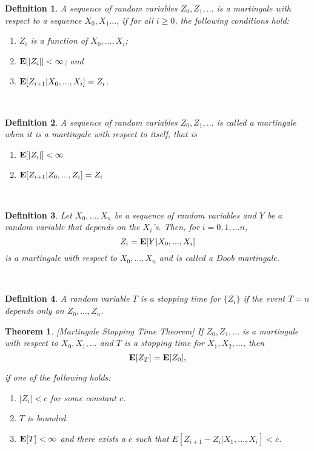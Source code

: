 \documentclass[11pt]{article}
\theoremstyle{mytheoremstyle}
\newtheorem{theorem}{Theorem}
\newtheorem{definition}{Definition}
\begin{document}
\begin{definition}
	A sequence of random variables $Z_{0},Z_{1},...$ is a \emph{martingale
		with respect to a sequence $X_{0},X_{1}...$,} if for all $i\geq0$,
	the following conditions hold:
	
	\begin{enumerate}
		\item $Z_{i}$ is a function of $X_{0},...,X_{i}$;
		\item $\mathrm{\mathbf{E}}[|Z_{i}|]<\infty$; and
		\item $\mathrm{\mathbf{E}}[Z_{i+1}|X_{0},...,X_{i}]=Z_{i}$.
	\end{enumerate}
\end{definition}
~
\begin{definition}
	A sequence of random variables $Z_{0},Z_{1},...$ is called a \emph{martingale}
	when it is a martingale with respect to itself, that is
	
	\begin{enumerate}
		\item $\mathrm{\mathbf{E}}[|Z_{i}|]<\infty$ 
		\item $\mathrm{\mathbf{E}}[Z_{i+1}|Z_{0},...,Z_{i}]=Z_{i}$
	\end{enumerate}
\end{definition}
~
\begin{definition}
	Let $X_{0},...,X_{n}$ be a sequence of random variables and $Y$
	be a random variable that depends on the $X_{i}$'s. Then, for $i=0,1,...n$,
	\[
	Z_{i}=\mathrm{\mathbf{E}}[Y|X_{0},...,X_{i}]
	\]
	is a martingale with respect to $X_{0},...,X_{n}$ and is called
	a \emph{Doob martingale}.
\end{definition}
~
\begin{definition}
	A random variable $T$ is a stopping time for $\{Z_{i}\}$ if the
	event $T=n$ depends only on $Z_{0},...,Z_{n}$.
\end{definition}
\begin{theorem}
	\emph{{[}Martingale Stopping Time Theorem{]}} If $Z_{0},Z_{1},...$
	is a martingale with respect to $X_{0},X_{1},...$ and $T$ is a stopping
	time for $X_{1},X_{2},...$, then 
	\[
	\mathrm{\mathbf{E}}[Z_{T}]=\mathrm{\mathbf{E}}[Z_{0}],
	\]
	
	if one of the following holds:
	
	\begin{enumerate}
		\item $|Z_{i}|<c$ for some constant $c$.
		\item $T$ is bounded.
		\item $\mathrm{\mathbf{E}}[T]<\infty$ and there exists a $c$ such that $E[Z_{i+1}-Z_{i}|X_{1},...,X_{i}]<c$.
	\end{enumerate}
\end{theorem}
\end{document}
